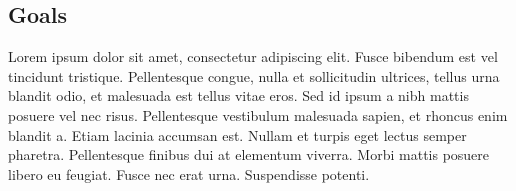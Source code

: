 \subsection{Goals}

Lorem ipsum dolor sit amet, consectetur adipiscing elit. Fusce bibendum est vel tincidunt tristique. Pellentesque congue, nulla et sollicitudin ultrices, tellus urna blandit odio, et malesuada est tellus vitae eros. Sed id ipsum a nibh mattis posuere vel nec risus. Pellentesque vestibulum malesuada sapien, et rhoncus enim blandit a. Etiam lacinia accumsan est. Nullam et turpis eget lectus semper pharetra. Pellentesque finibus dui at elementum viverra. Morbi mattis posuere libero eu feugiat. Fusce nec erat urna. Suspendisse potenti.